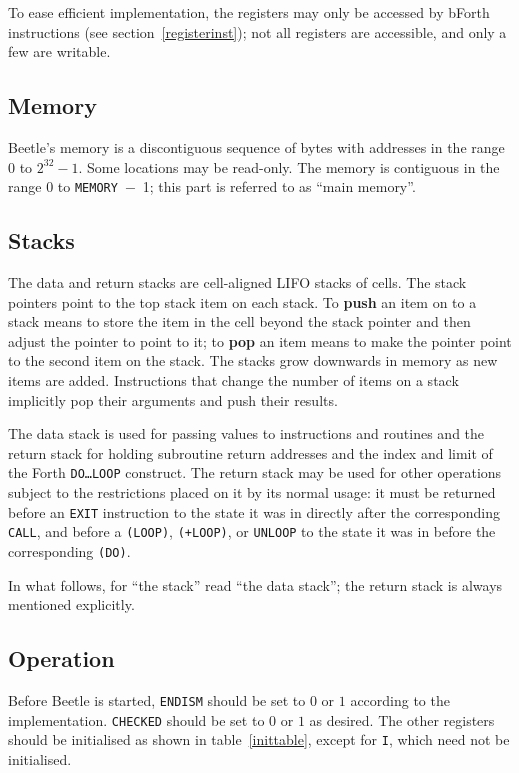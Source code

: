 \documentclass[english]{article}
\begin{document}
To ease efficient implementation, the registers may only be accessed
by bForth instructions (see section~\ref{registerinst}); not all registers are accessible, and only a few are writable.


\subsection{Memory}

Beetle's memory is a discontiguous sequence of bytes with addresses in the range $0$ to $2^{32}-1$. Some locations may be read-only. The memory is contiguous in the range $0$ to {\tt MEMORY}~$-$~1; this part is referred to as ``main memory''.

\subsection{Stacks}

The data and return stacks are cell-aligned LIFO stacks of cells. The stack
pointers point to the top stack item on each stack. To {\bf push} an item on to
a stack means to store the item in the cell beyond the stack pointer and then
adjust the pointer to point to it; to {\bf pop} an item means to make the
pointer point to the second item on the stack. The stacks grow downwards in
memory as new items are added. Instructions that change the number of items on a
stack implicitly pop their arguments and push their results.

The data stack is used for passing values to instructions and routines and the
return stack for holding subroutine return addresses and the index and limit of
the Forth {\tt DO\dots LOOP} construct. The return stack may be used for other
operations subject to the restrictions placed on it by its normal usage: it must
be returned before an {\tt EXIT} instruction to the state it was in directly
after the corresponding {\tt CALL}, and before a {\tt (LOOP)}, {\tt (+LOOP)}, or
{\tt UNLOOP} to the state it was in before the corresponding {\tt (DO)}.

In what follows, for ``the stack'' read ``the data stack''; the return stack is
always mentioned explicitly.


\subsection{Operation}
\label{operation}

Before Beetle is started, {\tt ENDISM} should be set to $0$ or $1$ according to the implementation. {\tt CHECKED} should be set to $0$ or $1$ as desired. The other registers should be initialised as shown in table~\ref{inittable}, except for {\tt I}, which need not be initialised.
\end{document}
